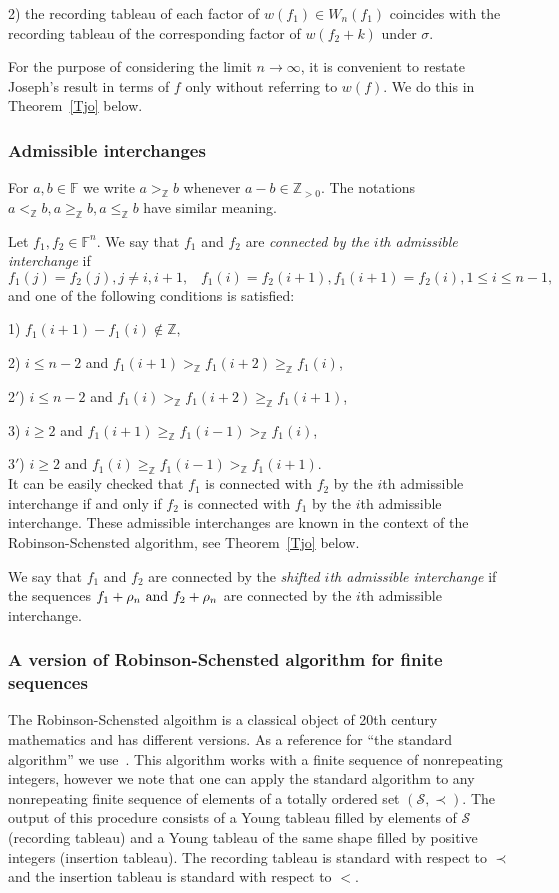 \documentclass[10pt]{amsart}\oddsidemargin -1mm \evensidemargin -1mm \topmargin -15mm\headheight5mm \headsep 3.5mm \textheight 245mm\textwidth 170mm
\theoremstyle{definition}\newtheorem{theorem}{Theorem}[section]\newtheorem{lemma}[theorem]{Lemma}\newtheorem{remark}[theorem]{Remark}\newtheorem{proposition}[theorem]{Proposition}\newtheorem{corollary}[theorem]{Corollary}\newtheorem{definition}[theorem]{Definition}\newtheorem{Ex}[theorem]{Example}\newtheorem{obs}[theorem]{Observation}\newtheorem{nota}[theorem]{Notation}
\begin{document}
2) the recording tableau of each factor of $w(f_1)\in W_n(f_1)$ coincides with the recording tableau of the corresponding factor of $w(f_2+k)$ under $\sigma$.

For the purpose of considering the limit $n\to\infty$, it is convenient to restate Joseph's result in terms of $f$ only without referring to $w(f)$. 
We do this in Theorem~\ref{Tjo} below. 
\subsubsection{Admissible interchanges}\label{SSkm} For $a, b\in\mathbb F$ we write $a>_{\mathbb Z}b$ whenever $a-b\in\mathbb Z_{>0}$. 
The notations $a<_\mathbb Zb, a\ge_{\mathbb Z}b, a\le_\mathbb Zb$ have similar meaning.

Let $f_1, f_2\in\mathbb F^n$. 
We say that $f_1$ and $f_2$ are {\it connected by the $i$th admissible interchange} if
$$f_1(j)=f_2(j), j\ne i, i+1,\hspace{10pt} f_1(i)=f_2(i+1), f_1(i+1)=f_2(i), 1\le i\le n-1,$$
and one of the following conditions is satisfied:

1) $f_1(i+1)-f_1(i)\not\in\mathbb Z,$

2) $i\le n-2$ and $f_1(i+1)>_{\mathbb Z} f_1(i+2)\ge_{\mathbb Z} f_1(i)$,

2$'$) $i\le n-2$ and $f_1(i)>_{\mathbb Z} f_1(i+2)\ge_{\mathbb Z} f_1(i+1)$,

3) $i\ge 2$ and $f_1(i+1)\ge_{\mathbb Z} f_1(i-1)>_{\mathbb Z} f_1(i)$,

3$'$) $i\ge 2$ and $f_1(i)\ge_{\mathbb Z} f_1(i-1)>_{\mathbb Z} f_1(i+1)$.\\
It can be easily checked that $f_1$ is connected with $f_2$ by the $i$th admissible interchange if and only if $f_2$ is connected with $f_1$ by the $i$th admissible interchange. 
These admissible interchanges are known in the context of the Robinson-Schensted algorithm, see Theorem~\ref{Tjo} below. 

We say that $f_1$ and $f_2$ are connected by the {\it shifted $i$th admissible interchange} if the sequences $f_1+\rho_n{\rm~and~}f_2+\rho_n$ are connected by the $i$th admissible interchange. 
\subsubsection{A version of Robinson-Schensted algorithm for finite sequences}\label{SSrskf}
The Robinson-Schensted algoithm is a classical object of 20th century mathematics and has different versions.
As a reference for ``the standard algorithm'' we use~\cite{Knu}. 
This algorithm works with a finite sequence of nonrepeating integers,  however we note that one can apply the standard algorithm to any nonrepeating finite sequence of elements of a totally ordered set $(\mathcal S, \prec)$.  
The output of this procedure consists of a Young tableau filled by elements of $\mathcal S$ (recording tableau) and a Young tableau of the same shape filled by positive integers (insertion tableau). 
The recording tableau is standard with respect to $\prec$ and the insertion tableau is standard with respect to $<$. 
\end{document}
